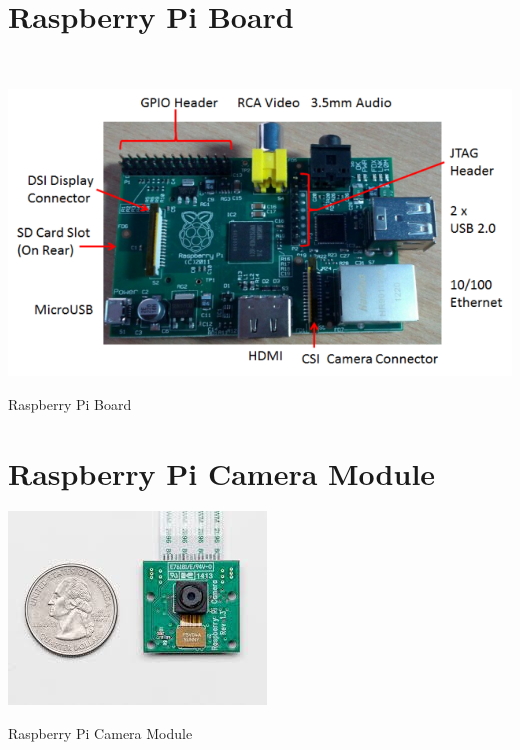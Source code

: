 \documentclass[12pt, a4paper]{article}
\begin{document}
\begin{appendices}
\section{Raspberry Pi Board}
~\\
\begin{appendixfig}
\centering
\includegraphics[scale=1.00]{RPiModelB.png}
\caption{Raspberry Pi Board}
\label{}
\end{appendixfig}

\newpage
\section{Raspberry Pi Camera Module}
\begin{appendixfig}
\centering
\includegraphics[scale=1.00]{index.jpeg}
\caption{Raspberry Pi Camera Module}
\label{}
\end{appendixfig}


\end{appendices}
\end{document}
